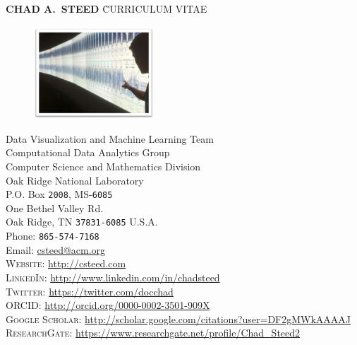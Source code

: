 \documentclass[11pt, letterpaper]{article}
\begin{document}
\thispagestyle{firststyle}



\begin{tabbing}
    {\sffamily \LARGE \textbf{CHAD A.\ STEED}} \` {\sffamily \LARGE CURRICULUM VITAE}
\end{tabbing}


\begin{figure}
  \vspace{-30pt}
  \begin{center}
    \includegraphics[width=0.4\textwidth]{climate-framed.png}
  \end{center}
  \vspace{-20pt}
\end{figure}

Data Visualization and Machine Learning Team\\
Computational Data Analytics Group\\
Computer Science and Mathematics Division\\
Oak Ridge National Laboratory\\
P.O. Box \texttt{2008}, MS-\texttt{6085}\\
One Bethel Valley Rd.\\
Oak Ridge, TN \texttt{37831-6085}
U.S.A.\\[.2cm]
Phone: \texttt{865-574-7168}\\
Email: \href{mailto:csteed@acm.org}{csteed@acm.org}\\[.2cm]
\textsc{Website}: \href{http://csteed.com}{http://csteed.com}\\
\textsc{LinkedIn}: \href{http://www.linkedin.com/in/chadsteed}{http://www.linkedin.com/in/chadsteed}\\
\textsc{Twitter}: \href{https://twitter.com/docchad}{https://twitter.com/docchad}\\
\textsc{ORCID}:
\href{http://orcid.org/0000-0002-3501-909X}{http://orcid.org/0000-0002-3501-909X}\\
\textsc{Google Scholar}: \href{http://scholar.google.com/citations?user=DF2gMWkAAAAJ}{http://scholar.google.com/citations?user=DF2gMWkAAAAJ}\\
\textsc{ResearchGate}: \href{https://www.researchgate.net/profile/Chad\_Steed2}{https://www.researchgate.net/profile/Chad\_Steed2}
\end{document}
